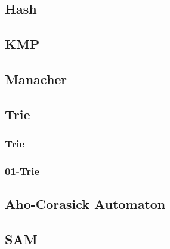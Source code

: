 \documentclass[a4paper]{article}
\begin{document}
\subsection{Hash}



\subsection{KMP}



\subsection{Manacher}



\subsection{Trie}

\subsubsection{Trie}



\subsubsection{01-Trie}



\subsection{Aho-Corasick Automaton}

\subsection{SAM}


\end{document}

